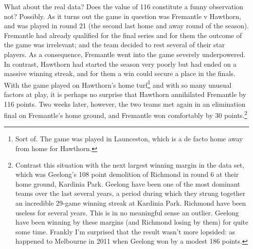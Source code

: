 \documentclass[
]{book}
\begin{document}
What about the real data? Does the value of 116 constitute a funny observation not? Possibly. As it turns out the game in question was Fremantle v Hawthorn, and was played in round 21 (the second last home and away round of the season). Fremantle had already qualified for the final series and for them the outcome of the game was irrelevant; and the team decided to rest several of their star players. As a consequence, Fremantle went into the game severely underpowered. In contrast, Hawthorn had started the season very poorly but had ended on a massive winning streak, and for them a win could secure a place in the finals. With the game played on Hawthorn's home turf\footnote{Sort of. The game was played in Launceston, which is a de facto home away from home for Hawthorn.} and with so many unusual factors at play, it is perhaps no surprise that Hawthorn annihilated Fremantle by 116 points. Two weeks later, however, the two teams met again in an elimination final on Fremantle's home ground, and Fremantle won comfortably by 30 points.\footnote{Contrast this situation with the next largest winning margin in the data set, which was Geelong's 108 point demolition of Richmond in round 6 at their home ground, Kardinia Park. Geelong have been one of the most dominant teams over the last several years, a period during which they strung together an incredible 29-game winning streak at Kardinia Park. Richmond have been useless for several years. This is in no meaningful sense an outlier. Geelong have been winning by these margins (and Richmond losing by them) for quite some time. Frankly I'm surprised that the result wasn't more lopsided: as happened to Melbourne in 2011 when Geelong won by a modest 186 points.}
\end{document}
